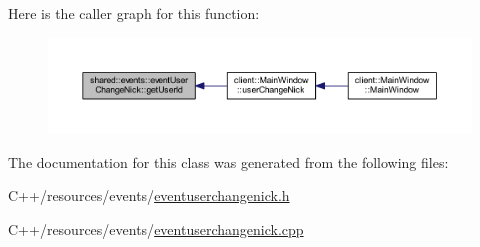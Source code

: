 Here is the caller graph for this function\-:
\nopagebreak
\begin{figure}[H]
\begin{center}
\leavevmode
\includegraphics[width=350pt]{d5/de1/classshared_1_1events_1_1event_user_change_nick_ad79adbb7cd52aa5307ff59ddbc2d8b7d_icgraph}
\end{center}
\end{figure}




The documentation for this class was generated from the following files\-:\begin{DoxyCompactItemize}
\item 
C++/resources/events/\hyperlink{eventuserchangenick_8h}{eventuserchangenick.\-h}\item 
C++/resources/events/\hyperlink{eventuserchangenick_8cpp}{eventuserchangenick.\-cpp}\end{DoxyCompactItemize}
